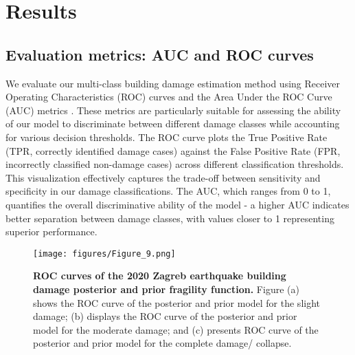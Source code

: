 \documentclass[review]{elsarticle}
\begin{document}
\section{Results}

\subsection{Evaluation metrics: AUC and ROC curves}
We evaluate our multi-class building damage estimation method using Receiver Operating Characteristics (ROC) curves and the Area Under the ROC Curve (AUC) metrics \cite{fawcett2006introduction}. These metrics are particularly suitable for assessing the ability of our model to discriminate between different damage classes while accounting for various decision thresholds.
The ROC curve plots the True Positive Rate (TPR, correctly identified damage cases) against the False Positive Rate (FPR, incorrectly classified non-damage cases) across different classification thresholds. This visualization effectively captures the trade-off between sensitivity and specificity in our damage classifications. The AUC, which ranges from 0 to 1, quantifies the overall discriminative ability of the model - a higher AUC indicates better separation between damage classes, with values closer to 1 representing superior performance.


   

\begin{figure*}[t]
    \centering    \texttt{[image: figures/Figure\_9.png]}
    \caption{\textbf{ROC curves of the 2020 Zagreb earthquake building damage posterior and prior fragility function.} Figure (a) shows the ROC curve of the posterior and prior model for the slight damage; (b) displays the ROC curve of the posterior and prior model for the moderate damage; and (c) presents ROC curve of the posterior and prior model for the complete damage/ collapse.}
\label{Zagreb_mul_roc}
\end{figure*}
\end{document}
